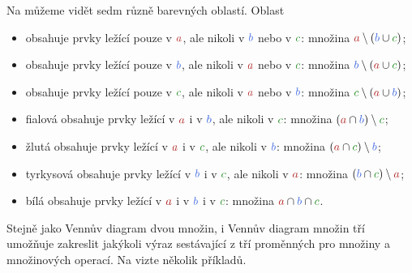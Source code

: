 Na  můžeme vidět sedm různě barevných
oblastí. Oblast
\begin{itemize}
  \item {} obsahuje prvky ležící pouze v $\clr{a}$, ale nikoli v
    $\clb{b}$ nebo v $\clg{c}$: množina $\clr{a} \setminus (\clb{b} \cup
    \clg{c})$;
  \item {} obsahuje prvky ležící pouze v $\clb{b}$, ale nikoli v
    $\clr{a}$ nebo v $\clg{c}$: množina $\clb{b} \setminus (\clr{a} \cup
    \clg{c})$;
  \item {} obsahuje prvky ležící pouze v $\clg{c}$, ale nikoli v
    $\clr{a}$ nebo v $\clb{b}$: množina $\clg{c} \setminus (\clr{a} \cup
    \clb{b})$;
  \item \textcolor{FireBrick!50!RoyalBlue}{fialová} obsahuje prvky ležící v
    $\clr{a}$ i v $\clb{b}$, ale nikoli v $\clg{c}$: množina $(\clr{a} \cap
    \clb{b}) \setminus \clg{c}$;
  \item \textcolor{FireBrick!50!ForestGreen}{žlutá} obsahuje prvky ležící v
    $\clr{a}$ i v $\clg{c}$, ale nikoli v $\clb{b}$: množina $(\clr{a} \cap
    \clg{c}) \setminus \clb{b}$;
  \item \textcolor{RoyalBlue!50!ForestGreen}{tyrkysová} obsahuje prvky ležící v
    $\clb{b}$ i v $\clg{c}$, ale nikoli v $\clr{a}$: množina $(\clb{b} \cap
    \clg{c}) \setminus \clr{a}$;
  \item \textcolor{FireBrick!33!RoyalBlue!33!ForestGreen!33!white}{bílá}
    obsahuje prvky ležící v $\clr{a}$ i v $\clb{b}$ i v $\clg{c}$: množina
    $\clr{a} \cap \clb{b} \cap \clg{c}$.
\end{itemize}

Stejně jako Vennův diagram dvou množin, i Vennův diagram množin tří umožňuje
zakreslit jakýkoli výraz sestávající z tří proměnných pro množiny a množinových
operací. Na  vizte několik příkladů.

